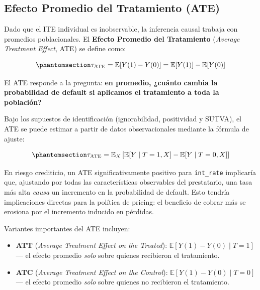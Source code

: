 \documentclass[
  spanish,
  11pt,
  letterpaper,
]{scrbook}
\providecommand{\tightlist}{%
  \setlength{\itemsep}{0pt}\setlength{\parskip}{0pt}}
\theoremstyle{plain}
\theoremstyle{remark}
\begin{document}
\subsection{Efecto Promedio del Tratamiento (ATE)}\label{sec-ate}

Dado que el ITE individual es inobservable, la inferencia causal trabaja
con promedios poblacionales. El \textbf{Efecto Promedio del Tratamiento}
(\emph{Average Treatment Effect}, ATE) se define como:

\begin{equation}\protect\phantomsection\label{eq-ate}{
\tau_{\text{ATE}} = \mathbb{E}[Y(1) - Y(0)] = \mathbb{E}[Y(1)] - \mathbb{E}[Y(0)]
}\end{equation}

El ATE responde a la pregunta: \textbf{en promedio, ¿cuánto cambia la
probabilidad de default si aplicamos el tratamiento a toda la
población?}

Bajo los supuestos de identificación (ignorabilidad, positividad y
SUTVA), el ATE se puede estimar a partir de datos observacionales
mediante la fórmula de ajuste:

\begin{equation}\protect\phantomsection\label{eq-ate-adjustment}{
\tau_{\text{ATE}} = \mathbb{E}_X \left[ \mathbb{E}[Y \mid T=1, X] - \mathbb{E}[Y \mid T=0, X] \right]
}\end{equation}

En riesgo crediticio, un ATE significativamente positivo para
\texttt{int\_rate} implicaría que, ajustando por todas las
características observables del prestatario, una tasa más alta
\emph{causa} un incremento en la probabilidad de default. Esto tendría
implicaciones directas para la política de pricing: el beneficio de
cobrar más se erosiona por el incremento inducido en pérdidas.

Variantes importantes del ATE incluyen:

\begin{itemize}
\tightlist
\item
  \textbf{ATT} (\emph{Average Treatment Effect on the Treated}):
  \(\mathbb{E}[Y(1) - Y(0) \mid T = 1]\) --- el efecto promedio
  \emph{solo} sobre quienes recibieron el tratamiento.
\item
  \textbf{ATC} (\emph{Average Treatment Effect on the Control}):
  \(\mathbb{E}[Y(1) - Y(0) \mid T = 0]\) --- el efecto promedio
  \emph{solo} sobre quienes no recibieron el tratamiento.
\end{itemize}
\end{document}
